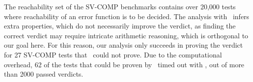 The reachability set of the SV-COMP benchmarks contains over 20,000 tests
where reachability of an error function is to be decided.
The analysis with \cpo\ infers extra properties, which do not necessarily improve the verdict,
as finding the correct verdict may require intricate arithmetic reasoning, which is orthogonal to our goal here.
For this reason, our analysis only succeeds in proving the verdict for 27 SV-COMP tests that \base\ could not prove.
Due to the computational overhead, 62 of the tests that could be proven by \base\ timed out with \cpo,
out of more than 2000 passed verdicts.

